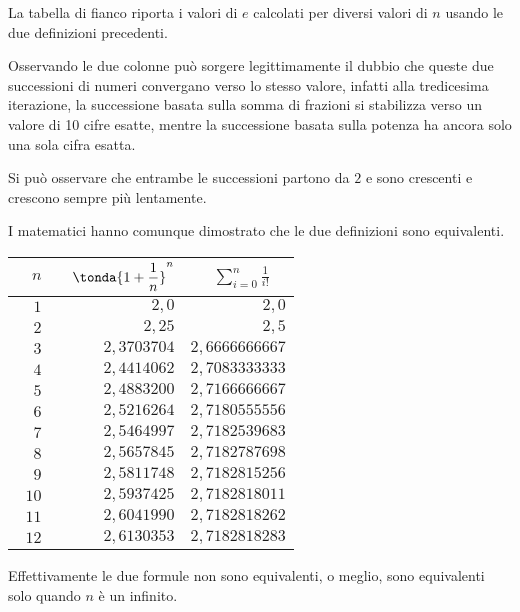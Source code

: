 \begin{minipage}{.49\textwidth}
La tabella di fianco riporta i valori di \(e\) calcolati per diversi valori 
di \(n\) usando le due definizioni precedenti.

Osservando le due colonne può sorgere legittimamente il dubbio che queste 
due successioni di numeri convergano verso lo stesso valore, 
infatti alla tredicesima iterazione, la successione 
basata sulla somma di frazioni si stabilizza verso un valore di 10 cifre 
esatte, mentre la successione basata sulla potenza ha ancora solo una sola 
cifra esatta.

Si può osservare che entrambe le successioni partono da \(2\) e sono 
crescenti e crescono sempre più lentamente.

I matematici hanno comunque dimostrato che le due definizioni sono 
equivalenti.

\end{minipage}
\hfill
\begin{minipage}{.49\textwidth}
\begin{center}
\begin{tabular}{rrr}
\(\quad n\) &
\(\quad \tonda{1+\dfrac{1}{n}}^n\) &
\(\quad \displaystyle \sum_{i=0}^{n}{\frac{1}{i!}} \quad\)\\
\hline
\(1\)  &       \(2,0\) &          \(2,0\) \\
\(2\)  &      \(2,25\) &          \(2,5\) \\
\(3\)  & \(2,3703704\) & \(2,6666666667\) \\
\(4\)  & \(2,4414062\) & \(2,7083333333\) \\
\(5\)  & \(2,4883200\) & \(2,7166666667\) \\
\(6\)  & \(2,5216264\) & \(2,7180555556\) \\
\(7\)  & \(2,5464997\) & \(2,7182539683\) \\
\(8\)  & \(2,5657845\) & \(2,7182787698\) \\
\(9\)  & \(2,5811748\) & \(2,7182815256\) \\
\(10\) & \(2,5937425\) & \(2,7182818011\) \\
\(11\) & \(2,6041990\) & \(2,7182818262\) \\
\(12\) & \(2,6130353\) & \(2,7182818283\) \\
\end{tabular}
\end{center}
\end{minipage}

Effettivamente le due formule non sono equivalenti, o meglio, sono 
equivalenti solo quando \(n\) è un infinito.

